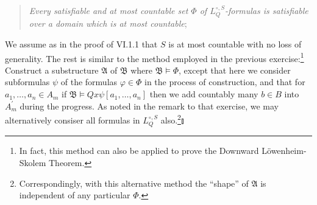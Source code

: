 \begin{enumerate}[1.]
\begin{quote}
\emph{Every satisfiable and at most countable set $\Phi$ of $L_Q^{\circ, S}$-formulas is satisfiable over a domain which is at most countable};
\end{quote}
We assume as in the proof of VI.1.1 that $S$ is at most countable with no loss of generality. The rest is similar to the method employed in the previous exercise:\footnote{In fact, this method can also be applied to prove the Downward L\"{o}wenheim-Skolem Theorem.} Construct a substructure $\mathfrak{A}$ of $\mathfrak{B}$ where $\mathfrak{B} \models \Phi$, except that here we consider subformulas $\psi$ of the formulas $\varphi \in \Phi$ in the process of construction, and that for $a_1, \ldots, a_n \in A_m$ if $\mathfrak{B} \models Qx \psi [a_1, \ldots, a_n]$ then we add countably many $b \in B$ into $A_m^\prime$ during the progress. As noted in the remark to that exercise, we may alternatively consiser all formulas in $L_Q^{\circ, S}$ also.\footnote{Correspondingly, with this alternative method the ``shape'' of $\mathfrak{A}$ is independent of any particular $\Phi$.}\nolinebreak\hfill$\talloblong$
\end{enumerate}
